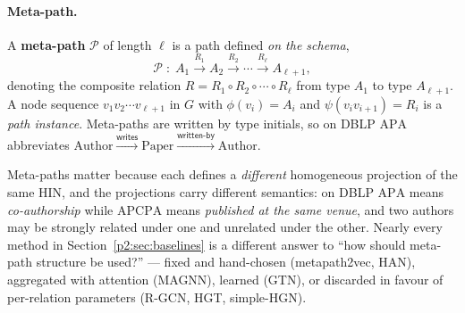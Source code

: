 \paragraph{Meta-path.}
A \textbf{meta-path} $\mathcal{P}$ of length $\ell$ is a path defined \emph{on the schema},
\[
  \mathcal{P}\;:\;A_1\xrightarrow{R_1}A_2\xrightarrow{R_2}\cdots\xrightarrow{R_\ell}A_{\ell+1},
\]
denoting the composite relation $R=R_1\circ R_2\circ\cdots\circ R_\ell$ from type $A_1$ to type
$A_{\ell+1}$. A node sequence $v_1v_2\cdots v_{\ell+1}$ in $G$ with $\phi(v_i)=A_i$ and
$\psi(v_iv_{i+1})=R_i$ is a \emph{path instance}. Meta-paths are written by type initials, so on
DBLP $\mathrm{APA}$ abbreviates
$\text{Author}\xrightarrow{\mathsf{writes}}\text{Paper}\xrightarrow{\mathsf{written\text{-}by}}\text{Author}$.

Meta-paths matter because each defines a \emph{different} homogeneous projection of the same HIN,
and the projections carry different semantics: on DBLP $\mathrm{APA}$ means \emph{co-authorship}
while $\mathrm{APCPA}$ means \emph{published at the same venue}, and two authors may be strongly
related under one and unrelated under the other. Nearly every method in
Section~\ref{p2:sec:baselines} is a different answer to ``how should meta-path structure be
used?'' --- fixed and hand-chosen (metapath2vec, HAN), aggregated with attention (MAGNN), learned
(GTN), or discarded in favour of per-relation parameters (R-GCN, HGT, simple-HGN).


